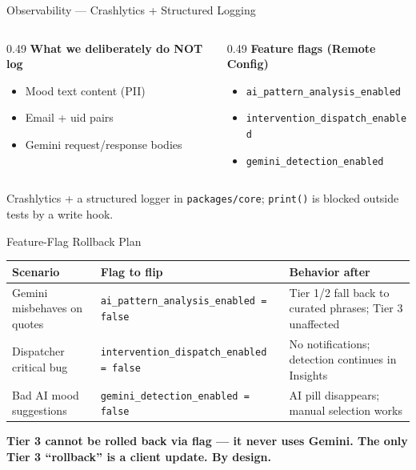 \documentclass[aspectratio=169,11pt]{beamer}
\begin{document}
\begin{frame}{Observability --- Crashlytics + Structured Logging}
\begin{columns}[T,onlytextwidth]
  \begin{column}{0.49\textwidth}
    \textbf{\color{moodred}What we deliberately do NOT log}
    \begin{itemize}\footnotesize
      \item Mood text content (PII)
      \item Email + uid pairs
      \item Gemini request/response bodies
    \end{itemize}
  \end{column}
  \begin{column}{0.49\textwidth}
    \textbf{\color{moodgreen}Feature flags (Remote Config)}
    \begin{itemize}\footnotesize
      \item \texttt{ai\_pattern\_analysis\_enabled}
      \item \texttt{intervention\_dispatch\_enabled}
      \item \texttt{gemini\_detection\_enabled}
    \end{itemize}
  \end{column}
\end{columns}
\vfill
{\footnotesize\color{gray!70} Crashlytics + a structured logger in \texttt{packages/core}; \texttt{print()} is blocked outside tests by a write hook.}
\end{frame}

\begin{frame}{Feature-Flag Rollback Plan}
\renewcommand{\arraystretch}{1.3}
\begin{tabularx}{\textwidth}{>{\raggedright\arraybackslash}p{} >{\raggedright\arraybackslash}p{} >{\raggedright\arraybackslash}X}
\toprule
\textbf{Scenario} & \textbf{Flag to flip} & \textbf{Behavior after} \\
\midrule
Gemini misbehaves on quotes & \texttt{ai\_pattern\_analysis\_enabled = false} & Tier 1/2 fall back to curated phrases; Tier 3 unaffected \\
Dispatcher critical bug & \texttt{intervention\_dispatch\_enabled = false} & No notifications; detection continues in Insights \\
Bad AI mood suggestions & \texttt{gemini\_detection\_enabled = false} & AI pill disappears; manual selection works \\
\bottomrule
\end{tabularx}
\vfill
{\footnotesize\color{moodred}\textbf{Tier 3 cannot be rolled back via flag --- it never uses Gemini. The only Tier 3 ``rollback'' is a client update. By design.}}
\end{frame}
\end{document}

